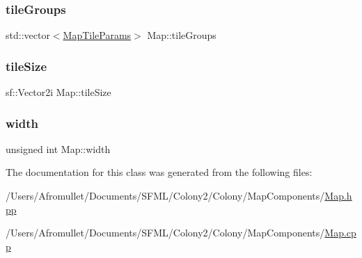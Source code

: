 \mbox{\label{class_map_a0f73f48de7a6630b79042eb7e768368b}} 
\subsubsection{\texorpdfstring{tile\+Groups}{tileGroups}}
{\footnotesize\ttfamily std\+::vector$<$\mbox{\hyperlink{_map_8hpp_a970bf0518d4d28fb59d97d608760830c}{Map\+Tile\+Params}}$>$ Map\+::tile\+Groups}

\mbox{\label{class_map_a1777f71edba289ab1e891492d651a491}} 
\subsubsection{\texorpdfstring{tile\+Size}{tileSize}}
{\footnotesize\ttfamily sf\+::\+Vector2i Map\+::tile\+Size\hspace{0.3cm}{\ttfamily [private]}}

\mbox{\label{class_map_aa510a987349c68df39475a3a217bd733}} 
\subsubsection{\texorpdfstring{width}{width}}
{\footnotesize\ttfamily unsigned int Map\+::width\hspace{0.3cm}{\ttfamily [private]}}



The documentation for this class was generated from the following files\+:\begin{DoxyCompactItemize}
\item 
/\+Users/\+Afromullet/\+Documents/\+S\+F\+M\+L/\+Colony2/\+Colony/\+Map\+Components/\mbox{\hyperlink{_map_8hpp}{Map.\+hpp}}\item 
/\+Users/\+Afromullet/\+Documents/\+S\+F\+M\+L/\+Colony2/\+Colony/\+Map\+Components/\mbox{\hyperlink{_map_8cpp}{Map.\+cpp}}\end{DoxyCompactItemize}
